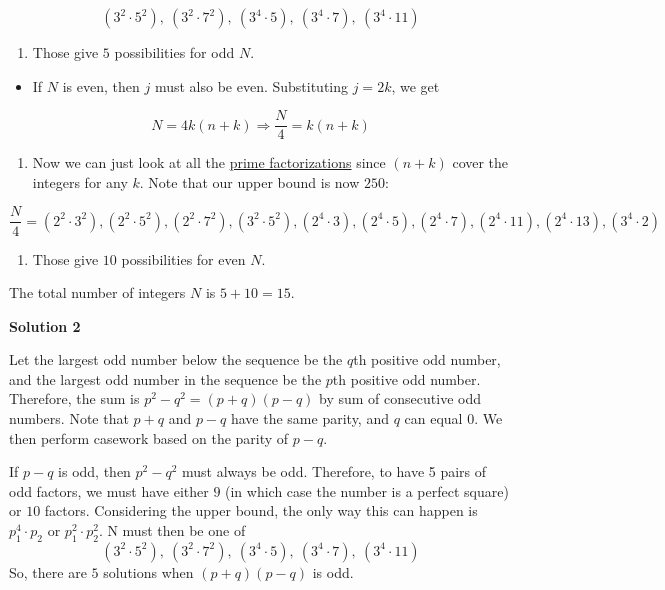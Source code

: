 \begin{enumerate}
 \[(3^2\cdot5^2),\ (3^2\cdot7^2),\ (3^4\cdot5),\ (3^4\cdot7),\ (3^4\cdot 11)\]

 
            \begin{enumerate}[label=(\roman*)]
                \item Those give $5$ possibilities for odd $N$.
            \end{enumerate}
            
            \begin{itemize}
        \item If $N$ is even, then $j$ must also be even. Substituting $j=2k$, we get
            \end{itemize}
            
 \[N = 4k(n+k) \Longrightarrow \frac{N}{4} = k(n+k)\]

 
            \begin{enumerate}[label=(\roman*)]
                \item Now we can just look at all the \href{https://artofproblemsolving.com/wiki/index.php?title=Prime\_factorization}{prime factorizations} since $(n+k)$ cover the integers for any $k$. Note that our upper bound is now $250$:
            \end{enumerate}
            
 \[\frac{N}{4} = (2^2\cdot3^2),(2^2\cdot5^2),(2^2\cdot7^2), (3^2\cdot5^2), (2^4\cdot3), (2^4\cdot5), (2^4\cdot7), (2^4\cdot11), (2^4\cdot13), (3^4\cdot2)\]

 
            \begin{enumerate}[label=(\roman*)]
                \item Those give $10$ possibilities for even $N$.
            \end{enumerate}
            The total number of integers $N$ is $5 + 10 = \boxed{15}$.

 



\textbf{Solution 2}

Let the largest odd number below the sequence be the $q$th positive odd number, and the largest odd number in the sequence be the $p$th positive odd number. Therefore, the sum is $p^2-q^2=(p+q)(p-q)$ by sum of consecutive odd numbers. Note that $p+q$ and $p-q$ have the same parity, and $q$ can equal $0$. We then perform casework based on the parity of $p-q$. 

 If $p-q$ is odd, then $p^2-q^2$ must always be odd.  Therefore, to have 5 pairs of odd factors, we must have either $9$ (in which case the number is a perfect square) or $10$ factors. Considering the upper bound, the only way this can happen is $p_1^4\cdot{p_2}$ or $p_1^2\cdot{p_2^2}$. N must then be one of
 \[(3^2\cdot5^2),\ (3^2\cdot7^2),\ (3^4\cdot5),\ (3^4\cdot7),\ (3^4\cdot 11)\]So, there are $5$ solutions when $(p+q)(p-q)$ is odd. 


\end{enumerate}
